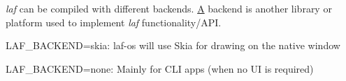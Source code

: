{\itshape laf} can be compiled with different backends. \mbox{\hyperlink{class_a}{A}} backend is another library or platform used to implement {\itshape laf} functionality/\+API.


\begin{DoxyItemize}
\item {\ttfamily LAF\+\_\+\+BACKEND=skia}\+: {\ttfamily laf-\/os} will use Skia for drawing on the native window
\item {\ttfamily LAF\+\_\+\+BACKEND=none}\+: Mainly for CLI apps (when no UI is required) 
\end{DoxyItemize}